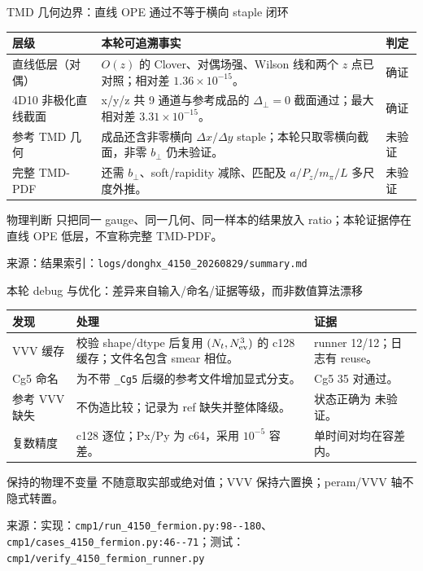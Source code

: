 \documentclass[UTF8,aspectratio=169,11pt]{ctexbeamer}
\newcommand{\source}[1]{\vspace{0.05em}\par{\raggedright\scriptsize\color{muted}来源：#1\par}}
\newcommand{\codepath}[1]{\nolinkurl{#1}}
\newcommand{\verified}{\textcolor{evidence}{确证}}
\newcommand{\unverified}{\textcolor{warning}{未验证}}
\begin{document}
\begin{frame}[t]{TMD 几何边界：直线 OPE 通过不等于横向 staple 闭环}
  \footnotesize
  \begin{tabularx}{0.96\textwidth}{@{}L Y Y@{}}
    \toprule
    层级 & 本轮可追溯事实 & 判定\\
    \midrule
    直线低层（对偶） & $O(z)$ 的 Clover、对偶场强、Wilson 线和两个 $z$ 点已对照；相对差 $1.36\times10^{-15}$。 & \verified\\
    4D10 非极化直线截面 & x/y/z 共 9 通道与参考成品的 $\Delta_\perp=0$ 截面通过；最大相对差 $3.31\times10^{-15}$。 & \verified\\
    参考 TMD 几何 & 成品还含非零横向 $\Delta x/\Delta y$ staple；本轮只取零横向截面，非零 $b_\perp$ 仍未验证。 & \unverified\\
    完整 TMD-PDF & 还需 $b_\perp$、soft/rapidity 减除、匹配及 $a/P_z/m_\pi/L$ 多尺度外推。 & \unverified\\
    \bottomrule
  \end{tabularx}
  \begin{block}{物理判断}
    只把同一 gauge、同一几何、同一样本的结果放入 ratio；本轮证据停在直线 OPE 低层，不宣称完整 TMD-PDF。
  \end{block}
  \source{结果索引：\codepath{logs/donghx_4150_20260829/summary.md}}
\end{frame}

\begin{frame}[t]{本轮 debug 与优化：差异来自输入/命名/证据等级，而非数值算法漂移}
  \footnotesize
  \renewcommand{\arraystretch}{1.00}
  \begin{tabularx}{0.96\textwidth}{@{}L Y Y@{}}
    \toprule
    发现 & 处理 & 证据\\
    \midrule
    VVV 缓存 & 校验 shape/dtype 后复用 $(N_t,N_{\rm ev}^3)$ 的 c128 缓存；文件名包含 smear 相位。 & runner 12/12；日志有 reuse。\\
    Cg5 命名 & 为不带 \codepath{_Cg5} 后缀的参考文件增加显式分支。 & Cg5 35 对通过。\\
    参考 VVV 缺失 & 不伪造比较；记录为 ref 缺失并整体降级。 & 状态正确为 \unverified。\\
    复数精度 & c128 逐位；Px/Py 为 c64，采用 $10^{-5}$ 容差。 & 单时间对均在容差内。\\
    \bottomrule
  \end{tabularx}
  \begin{block}{保持的物理不变量}
    不随意取实部或绝对值；VVV 保持六置换；peram/VVV 轴不隐式转置。
  \end{block}
  \source{实现：\codepath{cmp1/run_4150_fermion.py:98--180}、\codepath{cmp1/cases_4150_fermion.py:46--71}；测试：\codepath{cmp1/verify_4150_fermion_runner.py}}
\end{frame}
\end{document}
